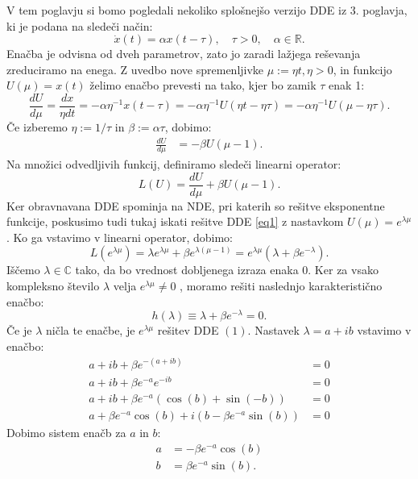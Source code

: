 \documentclass[12pt,a4paper]{amsart}
\theoremstyle{definition} %
\theoremstyle{plain} %
\newcommand{\R}{\mathbb R}
\newcommand{\C}{\mathbb C}
\begin{document}
V tem poglavju si bomo pogledali nekoliko splošnejšo verzijo DDE iz 3. poglavja, ki je podana na sledeči način:
\[\dot{x}(t)= \alpha x(t-\tau), \quad \tau > 0,\quad \alpha \in \R.\]
Enačba je odvisna od dveh parametrov, zato jo zaradi lažjega reševanja zreduciramo na enega.
Z uvedbo nove spremenljivke $\mu:=\eta t, \eta > 0$, in funkcijo
$U(\mu)=x(t)$ želimo enačbo prevesti na tako, kjer bo zamik $\tau$ enak 1:
\[\frac{dU}{d\mu}=\frac{dx}{\eta dt}=-\alpha \eta^{-1}x(t-\tau)=-\alpha \eta^{-1}U(\eta t - \eta \tau)=
-\alpha \eta^{-1}U(\mu - \eta \tau).\]
Če izberemo $\eta := 1/\tau$ in $\beta:=\alpha \tau$, dobimo:
\begin{equation} \label{eq1}
    \begin{split}
 \frac{dU}{d\mu} & =-\beta U(\mu -1).
    \end{split}
\end{equation}
Na množici odvedljivih funkcij, definiramo sledeči linearni operator:
\[L(U)=\frac{dU}{d\mu} + \beta U(\mu -1).\]
Ker obravnavana DDE spominja na NDE, pri katerih so rešitve eksponentne funkcije, poskusimo tudi tukaj
iskati rešitve DDE \eqref{eq1} z nastavkom $U(\mu)=e^{\lambda \mu}$. Ko ga vstavimo v linearni operator,
dobimo:
\[L(e^{\lambda \mu})= \lambda e^{\lambda \mu} + \beta e^{\lambda (\mu -1)}=
e^{\lambda \mu}(\lambda + \beta e^{-\lambda}).\]
Iščemo $\lambda \in \C$ tako, da bo vrednost dobljenega izraza enaka 0. Ker
za vsako kompleksno število $\lambda$ velja $e^{\lambda \mu} \neq 0$ , moramo rešiti naslednjo karakteristično
enačbo:
\[ h(\lambda) \equiv \lambda + \beta e^{-\lambda} =0.\]
Če je $\lambda$ ničla te enačbe, je $e^{\lambda\mu}$ rešitev DDE $(1)$.
Nastavek $\lambda = a + ib$ vstavimo v enačbo:
\begin{equation*}
    \begin{split}
        a + ib + \beta e^{-(a+ib)} &= 0 \\
        a + ib + \beta e^{-a}e^{-ib} &= 0 \\
        a + ib + \beta e^{-a}(\cos(b) + \sin(-b)) &= 0 \\
        a + \beta e^{-a}\cos(b) + i(b-\beta e^{-a}\sin(b)) &= 0
    \end{split}      
\end{equation*}
Dobimo sistem enačb za $a$ in $b$:
\begin{equation*}
    \begin{split}
        a &= -\beta e^{-a}\cos(b) \\
        b &= \beta e^{-a}\sin(b).
    \end{split}      
\end{equation*}
\end{document}

